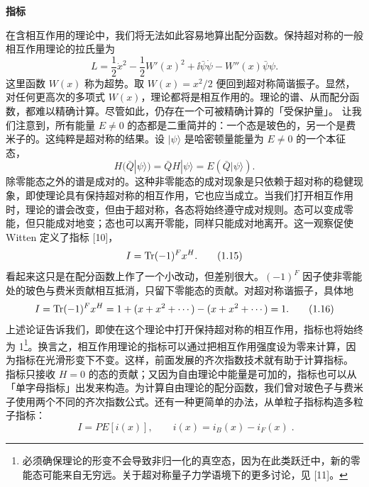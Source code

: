 \noindent\textbf{指标}\par
在含相互作用的理论中，我们将无法如此容易地算出配分函数。保持超对称的一般相互作用理论的拉氏量为
\[
L = \frac{1}{2}\dot x^2 - \frac{1}{2}W'(x)^2 + \ii\bar\psi\dot\psi - W''(x)\bar\psi\psi .
\tag{1.13}
\]
这里函数 $W(x)$ 称为超势。取 $W(x) = x^2/2$ 便回到超对称简谐振子。显然，对任何更高次的多项式 $W(x)$，理论都将是相互作用的。理论的谱、从而配分函数，都难以精确计算。尽管如此，仍存在一个可被精确计算的「受保护量」。
让我们注意到，所有能量 $E \neq 0$ 的态都是二重简并的：一个态是玻色的，另一个是费米子的。这纯粹是超对称的结果。设 $|\psi\rangle$ 是哈密顿量能量为 $E \neq 0$ 的一个本征态，
\[
H(\bar Q|\psi\rangle) = \bar Q H|\psi\rangle = E(\bar Q|\psi\rangle) .
\tag{1.14}
\]
除零能态之外的谱是成对的。这种非零能态的成对现象是只依赖于超对称的稳健现象，即使理论具有保持超对称的相互作用，它也应当成立。当我们打开相互作用时，理论的谱会改变，但由于超对称，各态将始终遵守成对规则。态可以变成零能，但只能成对地变；态也可以离开零能，同样只能成对地离开。这一观察促使 Witten 定义了指标 [10]，
\[
I = \operatorname{Tr}(-1)^F x^H .
\tag{1.15}
\]
看起来这只是在配分函数上作了一个小改动，但差别很大。$(-1)^F$ 因子使非零能处的玻色与费米贡献相互抵消，只留下零能态的贡献。对超对称谐振子，具体地
\[
I = \operatorname{Tr}(-1)^F x^H = 1 + (x + x^2 + \cdots) - (x + x^2 + \cdots) = 1 .
\tag{1.16}
\]
上述论证告诉我们，即使在这个理论中打开保持超对称的相互作用，指标也将始终为 1\footnote{必须确保理论的形变不会导致非归一化的真空态，因为在此类跃迁中，新的零能态可能来自无穷远。关于超对称量子力学语境下的更多讨论，见 [11]。}。换言之，相互作用理论的指标可以通过把相互作用强度设为零来计算，因为指标在光滑形变下不变。这样，前面发展的齐次指数技术就有助于计算指标。
指标只接收 $H = 0$ 的态的贡献；又因为自由理论中能量是可加的，指标也可以从「单字母指标」出发来构造。为计算自由理论的配分函数，我们曾对玻色子与费米子使用两个不同的齐次指数公式。还有一种更简单的办法，从单粒子指标构造多粒子指标：
\[
\boxed{\;I = PE[i(x)],\qquad i(x) = i_B(x) - i_F(x)\;.}
\tag{1.17}
\]
